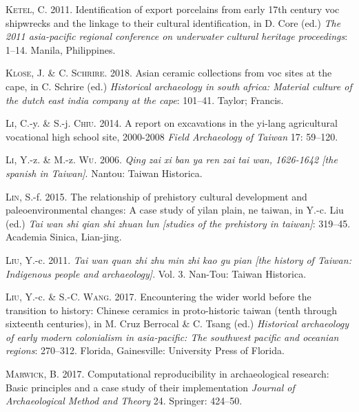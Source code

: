 \documentclass[]{article}
\begin{document}
\leavevmode\hypertarget{ref-Ketel2011}{}%
\textsc{Ketel}, C. 2011. Identification of export porcelains from early
17th century voc shipwrecks and the linkage to their cultural
identification, in D. Core (ed.) \emph{The 2011 asia-pacific regional
conference on underwater cultural heritage proceedings}: 1--14. Manila,
Philippines.

\leavevmode\hypertarget{ref-Klose2018}{}%
\textsc{Klose}, J. \& C. \textsc{Schrire}. 2018. Asian ceramic
collections from voc sites at the cape, in C. Schrire (ed.)
\emph{Historical archaeology in south africa: Material culture of the
dutch east india company at the cape}: 101--41. Taylor; Francis.

\leavevmode\hypertarget{ref-Li2014}{}%
\textsc{Li}, C.-y. \& S.-j. \textsc{Chiu}. 2014. A report on excavations
in the yi-lang agricultural vocational high school site, 2000-2008
\emph{Field Archaeology of Taiwan} 17: 59--120.

\leavevmode\hypertarget{ref-LiandWu2006}{}%
\textsc{Li}, Y.-z. \& M.-z. \textsc{Wu}. 2006. \emph{Qing zai xi ban ya
ren zai tai wan, 1626-1642 {[}the spanish in Taiwan{]}}. Nantou: Taiwan
Historica.

\leavevmode\hypertarget{ref-Lin2015}{}%
\textsc{Lin}, S.-f. 2015. The relationship of prehistory cultural
development and paleoenvironmental changes: A case study of yilan plain,
ne taiwan, in Y.-c. Liu (ed.) \emph{Tai wan shi qian shi zhuan lun
{[}studies of the prehistory in taiwan{]}}: 319--45. Academia Sinica,
Lian-jing.

\leavevmode\hypertarget{ref-Liu2011}{}%
\textsc{Liu}, Y.-c. 2011. \emph{Tai wan quan zhi zhu min zhi kao gu pian
{[}the history of Taiwan: Indigenous people and archaeology{]}}. Vol. 3.
Nan-Tou: Taiwan Historica.

\leavevmode\hypertarget{ref-Liu2017}{}%
\textsc{Liu}, Y.-c. \& S.-C. \textsc{Wang}. 2017. Encountering the wider
world before the transition to history: Chinese ceramics in
proto-historic taiwan (tenth through sixteenth centuries), in M. Cruz
Berrocal \& C. Tsang (ed.) \emph{Historical archaeology of early modern
colonialism in asia-pacific: The southwest pacific and oceanian
regions}: 270--312. Florida, Gainesville: University Press of Florida.

\leavevmode\hypertarget{ref-Marwick2017}{}%
\textsc{Marwick}, B. 2017. Computational reproducibility in
archaeological research: Basic principles and a case study of their
implementation \emph{Journal of Archaeological Method and Theory} 24.
Springer: 424--50.
\end{document}
